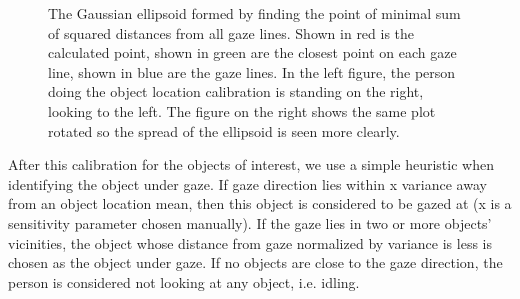 \begin{figure}[h]
\begin{subfigure}[b]{0.49\textwidth}
	\end{subfigure}
	\caption{The Gaussian ellipsoid formed by finding the point of minimal sum of squared distances from all gaze lines.  Shown in red is the calculated point, shown in green are the closest point on each gaze line, shown in blue are the gaze lines.  In the left figure, the person doing the object location calibration is standing on the right, looking to the left.  The figure on the right shows the same plot rotated so the spread of the ellipsoid is seen more clearly.}
	\label{fig:locCalibResults}
\end{figure}

After this calibration for the objects of interest, we use a simple heuristic when identifying the object under gaze.  If gaze direction lies within x variance away from an object location mean, then this object is considered to be gazed at (x is a sensitivity parameter chosen manually).  If the gaze lies in two or more objects' vicinities, the object whose distance from gaze normalized by variance is less is chosen as the object under gaze.  If no objects are close to the gaze direction, the person is considered not looking at any object, i.e. idling.